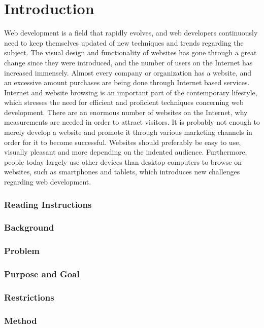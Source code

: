 \chapter{Introduction}

\setcounter{section}{2}
\setcounter{subsection}{0}

Web development is a field that rapidly evolves, and web developers continuously need to keep themselves updated of new techniques and trends regarding the subject. The visual design and functionality of websites has gone through a great change since they were introduced, and the number of users on the Internet has increased immensely. Almost every company or organization has a website, and an excessive amount purchases are being done through Internet based services. Internet and website browsing is an important part of the contemporary lifestyle, which stresses the need for efficient and proficient techniques concerning web development. 
There are an enormous number of websites on the Internet, why measurements are needed in order to attract visitors. It is probably not enough to merely develop a website and promote it through various marketing channels in order for it to become successful. Websites should preferably be easy to use, visually pleasant and more depending on the indented audience. Furthermore, people today largely use other devices than desktop computers to browse on websites, such as smartphones and tablets, which introduces new challenges regarding web development.


\subsection{Reading Instructions}

\subsection{Background}

\subsection{Problem}

\subsection{Purpose and Goal}

\subsection{Restrictions}

\subsection{Method}
